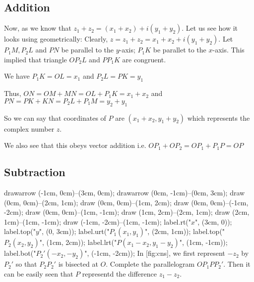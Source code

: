 \subsection{Addition}
Now, as we know that $z_1 + z_2 = (x_1 + x_2) + i(y_1 + y_2)$. Let us see how it looks using geometrically:
Clearly, $z = z_1 + z_2 = x_1 + x_2 + i(y_1 + y_2)$. Let $P_1M, P_2L$ and $PN$ be parallel to the $y$-axis; $P_1K$ be parallet to
the $x$-axis. This implied that triangle $OP_2L$ and $PP_1K$ are congruent.

We have $P_1K = OL = x_1$ and $P_2L = PK = y_1$

Thus, $ON = OM + MN = OL + P_1K = x_1 + x_2$ and $PN = PK + KN = P_2L + P_1M = y_2 + y_1$

So we can say that coordinates of $P$ are $(x_1 + x_2, y_1 + y_2)$ which represents the complex number $z.$

We also see that this obeys vector addition i.e. $OP_1 + OP_2 = OP_1 + P_1P = OP$

\subsection{Subtraction}
\startplacefigure[title={Complex numbers subtraction},reference=fig:cns]
\startMPcode
drawarrow (-1cm, 0cm)--(3cm, 0cm);
drawarrow (0cm, -1cm)--(0cm, 3cm);
draw (0cm, 0cm)--(2cm, 1cm);
draw (0cm, 0cm)--(1cm, 2cm);
draw (0cm, 0cm)--(-1cm, -2cm);
draw (0cm, 0cm)--(1cm, -1cm);
draw (1cm, 2cm)--(2cm, 1cm);
draw (2cm, 1cm)--(1cm, -1cm);
draw (-1cm, -2cm)--(1cm, -1cm);
label.rt("$x$", (3cm, 0));
label.top("$y$", (0, 3cm));
label.urt("$P_1(x_1, y_1)$", (2cm, 1cm));
label.top("$P_2(x_2, y_2)$", (1cm, 2cm));
label.lrt("$P(x_1 - x_2, y_1 - y_2)$", (1cm, -1cm));
label.bot("$P_2'(-x_2,- y_2)$", (-1cm, -2cm));
\stopMPcode
\stopplacefigure
In  [fig:cns], we first represent $-z_2$ by $P_2'$ so that  $P_2P_2'$ is bisected at $O.$ Complete the parallelogram $OP_1PP_2'.$ Then it can be
easily seen that $P$  representd the difference $z_1 - z_2.$


